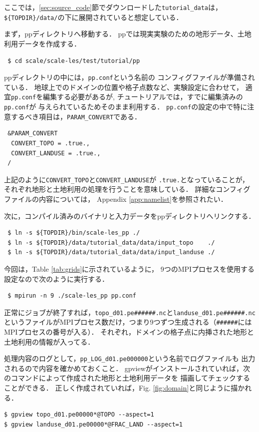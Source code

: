 ここでは，\ref{sec:source_code}節でダウンロードした\verb|tutorial_data|は，
\verb|${TOPDIR}/data/|の下に展開されていると想定している．

まず，ppディレクトリへ移動する．
ppでは現実実験のための地形データ、土地利用データを作成する．
\begin{verbatim}
 $ cd scale/scale-les/test/tutorial/pp
\end{verbatim}
ppディレクトリの中には，\verb|pp.conf|という名前の
コンフィグファイルが準備されている．
地球上でのドメインの位置や格子点数など、実験設定に合わせて，
適宜\verb|pp.conf|を編集する必要があるが,
チュートリアルでは，すでに編集済みの\verb|pp.conf|が
与えられているためそのまま利用する．
\verb|pp.conf|の設定の中で特に注意するべき項目は，\verb|PARAM_CONVERT|である．
\begin{verbatim}
 &PARAM_CONVERT
  CONVERT_TOPO = .true.,
  CONVERT_LANDUSE = .true.,
 /
\end{verbatim}
上記のように\verb|CONVERT_TOPO|と\verb|CONVERT_LANDUSE|が
\verb|.true.|となっていることが，
それぞれ地形と土地利用の処理を行うことを意味している．
詳細なコンフィグファイルの内容については，
Appendix \ref{app:namelist}を参照されたい．

次に，コンパイル済みのバイナリと入力データをppディレクトリへリンクする．
\begin{verbatim}
 $ ln -s ${TOPDIR}/bin/scale-les_pp ./
 $ ln -s ${TOPDIR}/data/tutorial_data/data/input_topo    ./
 $ ln -s ${TOPDIR}/data/tutorial_data/data/input_landuse ./
\end{verbatim}
今回は，Table \ref{tab:grids}に示されているように，
9つのMPIプロセスを使用する設定なので次のように実行する．
\begin{verbatim}
 $ mpirun -n 9 ./scale-les_pp pp.conf
\end{verbatim}
正常にジョブが終了すれば，\verb|topo_d01.pe######.nc|と\verb|landuse_d01.pe######.nc|というファイルがMPIプロセス数だけ，つまり9つずつ生成される（\verb|######|にはMPIプロセスの番号が入る）．
それぞれ，ドメインの格子点に内挿された地形と土地利用の情報が入ってる．

処理内容のログとして，\verb|pp_LOG_d01.pe000000|という名前でログファイルも
出力されるので内容を確かめておくこと．
gpviewがインストールされていれば，次のコマンドによって作成された地形と土地利用データを
描画してチェックすることができる．
正しく作成されていれば，Fig. \ref{fig:domain}と同じように描かれる．
\begin{verbatim}
$ gpview topo_d01.pe00000*@TOPO --aspect=1
$ gpview landuse_d01.pe00000*@FRAC_LAND --aspect=1
\end{verbatim}


